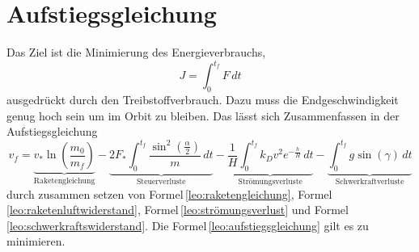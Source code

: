 %
%
%
%
\section{Aufstiegsgleichung 
\label{leo:section:aufstiegsgleichung}}
Das Ziel ist die Minimierung des Energieverbrauchs,
\begin{equation}
	J = \int_{0}^{t_f} F \, dt
\end{equation}
ausgedrückt durch den Treibstoffverbrauch.
Dazu muss die Endgeschwindigkeit genug hoch sein um im Orbit zu bleiben.
Das lässt sich Zusammenfassen in der Aufstiegsgleichung
\begin{equation}
	v_f = \underbrace{v_* \ln \left(\frac{m_0}{m_f}\right)}_{\text{Raketengleichung}} 
	- \underbrace{2F_* \int_0^{t_f} \frac{\sin^2\left(\frac{\alpha}{2}\right)}{m} \, dt }_{\text{Steuerverluste}}
	- \underbrace{\frac{1}{H} \int_0^{t_f} k_Dv^2 e^{-\frac{h}{H}} \, dt }_{\text{Strömungsverluste}}
	- \underbrace{\int_0^{t_f} g \sin \left(\gamma\right) \, dt}_{\text{Schwerkraftverluste}}
	\label{leo:aufstiegsgleichung}
\end{equation}
durch zusammen setzen von  Formel\,\eqref{leo:raketengleichung},  Formel\,\eqref{leo:raketenluftwiderstand}, Formel\,\eqref{leo:strömungsverlust} und Formel\,\eqref{leo:schwerkraftswiderstand}.
Die Formel\,\eqref{leo:aufstiegsgleichung} gilt es zu minimieren.



